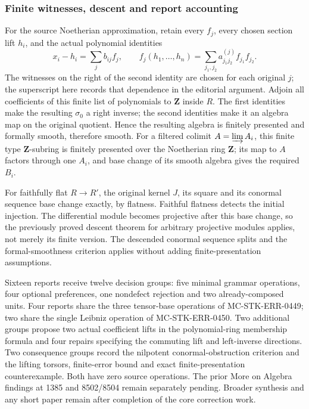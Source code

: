 \subsubsection{Finite witnesses, descent and report accounting}\label{algebra-proof-048-finite-witnesses-descent-and-report-accounting}

For the source Noetherian approximation, retain every \(f_j\), every chosen section lift \(h_i\), and the actual polynomial identities \[
x_i-h_i=\sum_j b_{ij}f_j,\qquad
f_j(h_1,\ldots,h_n)=\sum_{j_1,j_2}a^{(j)}_{j_1j_2}f_{j_1}f_{j_2}.
\] The witnesses on the right of the second identity are chosen for each original \(j\); the superscript here records that dependence in the editorial argument. Adjoin all coefficients of this finite list of polynomials to \(\mathbf Z\) inside \(R\). The first identities make the resulting \(\sigma_0\) a right inverse; the second identities make it an algebra map on the original quotient. Hence the resulting algebra is finitely presented and formally smooth, therefore smooth. For a filtered colimit \(A=\varinjlim A_i\), this finite type \(\mathbf Z\)-subring is finitely presented over the Noetherian ring \(\mathbf Z\); its map to \(A\) factors through one \(A_i\), and base change of its smooth algebra gives the required \(B_i\).

For faithfully flat \(R\to R'\), the original kernel \(J\), its square and its conormal sequence base change exactly, by flatness. Faithful flatness detects the initial injection. The differential module becomes projective after this base change, so the previously proved descent theorem for arbitrary projective modules applies, not merely its finite version. The descended conormal sequence splits and the formal-smoothness criterion applies without adding finite-presentation assumptions.

Sixteen reports receive twelve decision groups: five minimal grammar operations, four optional preferences, one nondefect rejection and two already-composed units. Four reports share the three tensor-base operations of MC-STK-ERR-0449; two share the single Leibniz operation of MC-STK-ERR-0450. Two additional groups propose two actual coefficient lifts in the polynomial-ring membership formula and four repairs specifying the commuting lift and left-inverse directions. Two consequence groups record the nilpotent conormal-obstruction criterion and the lifting torsors, finite-error bound and exact finite-presentation counterexample. Both have zero source operations. The prior More on Algebra findings at 1385 and 8502/8504 remain separately pending. Broader synthesis and any short paper remain after completion of the core correction work.
